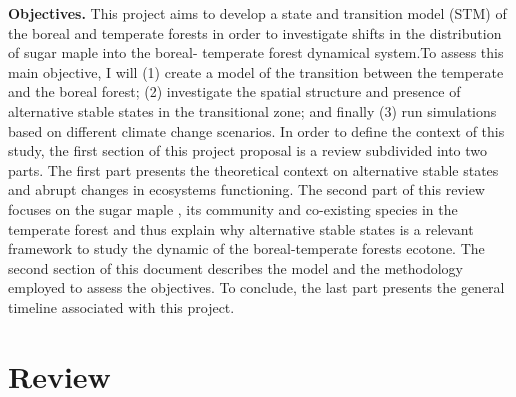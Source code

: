 \textbf{Objectives.} This project aims to develop a state
and transition model (STM) of the boreal and temperate forests in order to
investigate shifts in the distribution of sugar maple into the boreal-
temperate forest dynamical system.To assess this main objective, I will (1)
create a  model of the transition between the temperate and the boreal forest;
(2) investigate the spatial structure and presence of alternative stable states in the
transitional zone; and finally (3) run simulations based on different climate
change scenarios.  In order to define the context of this study, the first
section of this project proposal is a review subdivided into two parts. The
first part presents the theoretical context on alternative stable states and
abrupt changes in ecosystems functioning. The second part of this review
focuses on the sugar maple , its community and co-existing species in the
temperate forest and thus explain why alternative stable states is a relevant
framework to study the dynamic of the boreal-temperate forests ecotone.  The
second section of this document describes the model and the methodology
employed to assess the objectives. To conclude, the last part presents the
general timeline associated with this project.


\section{Review} 

